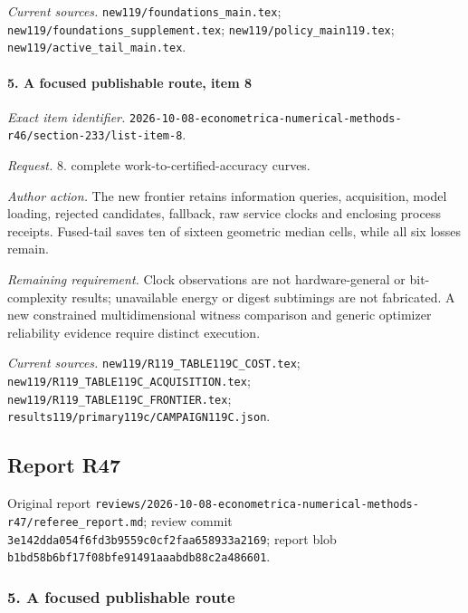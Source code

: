 \par\emph{Current sources.} \nolinkurl{new119/foundations_main.tex}; \nolinkurl{new119/foundations_supplement.tex}; \nolinkurl{new119/policy_main119.tex}; \nolinkurl{new119/active_tail_main.tex}.

\paragraph{5. A focused publishable route, item 8}

\emph{Exact item identifier.} \nolinkurl{2026-10-08-econometrica-numerical-methods-r46/section-233/list-item-8}.

\par\emph{Request.} 8. complete work-to-certified-accuracy curves.

\par\emph{Author action.} The new frontier retains information queries, acquisition, model loading, rejected candidates, fallback, raw service clocks and enclosing process receipts. Fused-tail saves ten of sixteen geometric median cells, while all six losses remain.

\par\emph{Remaining requirement.} Clock observations are not hardware-general or bit-complexity results; unavailable energy or digest subtimings are not fabricated. A new constrained multidimensional witness comparison and generic optimizer reliability evidence require distinct execution.

\par\emph{Current sources.} \nolinkurl{new119/R119_TABLE119C_COST.tex}; \nolinkurl{new119/R119_TABLE119C_ACQUISITION.tex}; \nolinkurl{new119/R119_TABLE119C_FRONTIER.tex}; \nolinkurl{results119/primary119c/CAMPAIGN119C.json}.

\subsection{Report R47}

Original report \nolinkurl{reviews/2026-10-08-econometrica-numerical-methods-r47/referee_report.md}; review commit \nolinkurl{3e142dda054f6fd3b9559c0cf2faa658933a2169}; report blob \nolinkurl{b1bd58b6bf17f08bfe91491aaabdb88c2a486601}.

\subsubsection{5. A focused publishable route}

